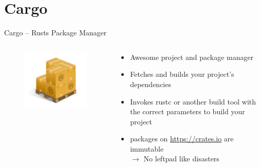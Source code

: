 \documentclass[aspectratio=1610,t]{beamer}
\begin{document}
\section{Cargo}

\begin{frame}[c]{Cargo -- Rusts Package Manager}
  \begin{columns}[onlytextwidth]
    \begin{column}{.3\textwidth}
      \centering
      \begin{figure}
      \includegraphics[width=\textwidth]{./Cargo-Logo-Small.png}
      \end{figure}
    \end{column}
    \begin{column}{.7\textwidth}
      \begin{itemize}
        \item Awesome project and package manager
        \item Fetches and builds your project’s dependencies
        \item Invokes rustc or another build tool with the correct parameters
          to build your project
        \item packages on \url{https://crates.io} are immutable\\ $\rightarrow$
          No leftpad like disasters
      \end{itemize}
    \end{column}
  \end{columns}
\end{frame}
\end{document}
